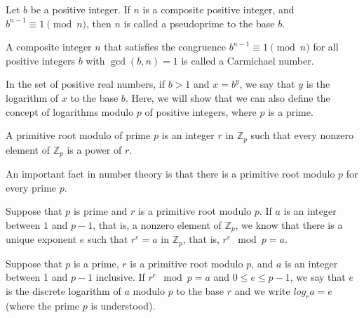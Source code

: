\documentclass[../discrete.tex]{subfiles}
\begin{document}
\begin{definition}
    Let $b$ be a positive integer. If $n$ is a composite positive integer, and 
    $b^{n-1}\equiv 1\pmod{n}$, then $n$ is called a pseudoprime to the base $b$.
\end{definition}

\begin{definition}
    A composite integer $n$ that satisfies the congruence $b^{n-1}\equiv 1\pmod{n}$ for all positive integers $b$ with 
    $\gcd(b,n)=1$ is called a Carmichael number.
\end{definition}

In the set of positive real numbers, if $b>1$ and $x=b^y$, we say that $y$ is the 
logarithm of $x$ to the base $b$. Here, we will show that we can also define the concept of logarithms 
modulo $p$ of positive integers, where $p$ is a prime.
\begin{definition}
    A primitive root modulo of prime $p$ is an integer $r$ in $\mathbb{Z}_p$ such that every nonzero element of $\mathbb{Z}_p$ is a power of $r$.
\end{definition}

An important fact in number theory is that there is a primitive root modulo $p$ for every prime $p$. 

Suppose that $p$ is prime and $r$ is a primitive root modulo $p$. If $a$ is an integer between $1$ and $p-1$, that is, 
a nonzero element of $\mathbb{Z}_p$, we know that there is a unique exponent $e$ such that $r^e=a$ in 
$\mathbb{Z}_p$, that is, $r^e \mod p = a$.
\begin{definition}
    Suppose that $p$ is a prime, $r$ is a primitive root modulo $p$, and $a$ is an integer between 
    1 and $p-1$ inclusive. If $r^e \mod p = a$ and $0\leq e \leq p-1$, we say that $e$ 
    is the discrete logarithm of $a$ modulo $p$ to the base $r$ and we write $log_r a = e$
    (where the prime $p$ is understood).
\end{definition}
\end{document}
